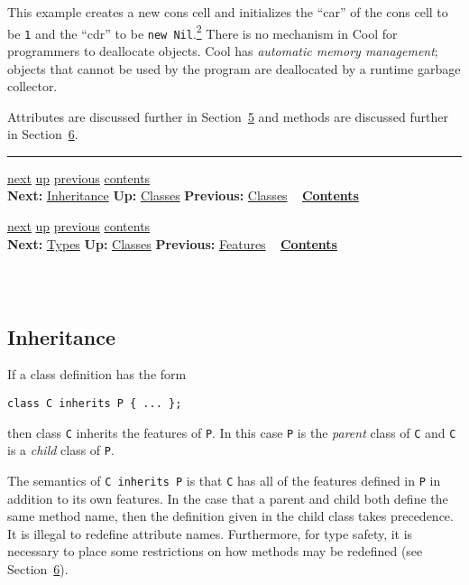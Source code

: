 \documentclass[]{article}
\begin{document}
This example creates a new cons cell and initializes the ``car'' of the
cons cell to be \texttt{1} and the ``cdr'' to be
\texttt{new Nil}.\href{footnode.html\#foot1771}{\textsuperscript{2}}
There is no mechanism in Cool for programmers to deallocate objects.
Cool has \emph{automatic memory management}; objects that cannot be used
by the program are deallocated by a runtime garbage collector.

Attributes are discussed further in
Section~\href{node10.html\#sec-attr}{5} and methods are discussed
further in Section~\href{node12.html\#sec-method}{6}.

\begin{center}\rule{3in}{0.4pt}\end{center}

\href{node6.html}{next} \href{node4.html}{up}
\href{node4.html}{previous} \href{node1.html}{contents} \\
\textbf{Next:} \href{node6.html}{Inheritance} \textbf{Up:}
\href{node4.html}{Classes} \textbf{Previous:} \href{node4.html}{Classes}
~ \textbf{\href{node1.html}{Contents}}

\href{node7.html}{next} \href{node4.html}{up}
\href{node5.html}{previous} \href{node1.html}{contents} \\
\textbf{Next:} \href{node7.html}{Types} \textbf{Up:}
\href{node4.html}{Classes} \textbf{Previous:}
\href{node5.html}{Features} ~ \textbf{\href{node1.html}{Contents}} \\ \\

\subsection{\\ Inheritance}

If a class definition has the form

\begin{verbatim}
class C inherits P { ... };
\end{verbatim}

then class \texttt{C} inherits the features of \texttt{P}. In this case
\texttt{P} is the \emph{parent} class of \texttt{C} and \texttt{C} is a
\emph{child} class of \texttt{P}.

The semantics of \texttt{C inherits P} is that \texttt{C} has all of the
features defined in \texttt{P} in addition to its own features. In the
case that a parent and child both define the same method name, then the
definition given in the child class takes precedence. It is illegal to
redefine attribute names. Furthermore, for type safety, it is necessary
to place some restrictions on how methods may be redefined (see
Section~\href{node12.html\#sec-method}{6}).
\end{document}
